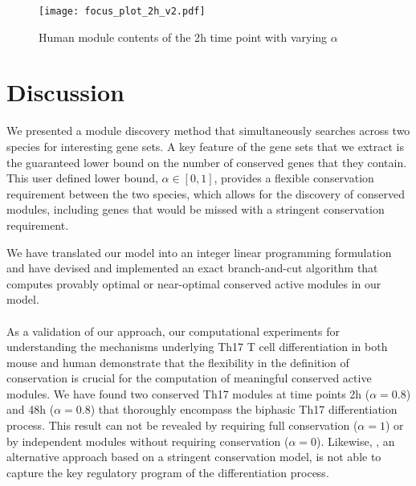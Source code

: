   \begin{figure}[p]
    \centering
    \texttt{[image: focus\_plot\_2h\_v2.pdf]}
    \caption{Human module contents of the \unit{2}{h} time point with varying $\alpha$}
    \label{fig:focus_plot}
  \end{figure}

\section{Discussion}
\label{sec:xdisc}

We presented a module discovery method that simultaneously searches across two species for interesting gene sets.
A key feature of the gene sets that we extract is the guaranteed lower bound on the number of conserved genes that they contain.
This user defined lower bound, $\alpha \in [0, 1]$, provides a flexible conservation requirement between the two species, which allows for the discovery of conserved modules, including genes that would be missed with a stringent conservation requirement.%

We have translated our model into an integer linear programming formulation and have devised and implemented an exact branch-and-cut algorithm that computes provably optimal or near-optimal conserved active modules in our model.

\paragraph{}
As a validation of our approach, our computational experiments for understanding the mechanisms underlying Th17 T cell differentiation in both mouse and human demonstrate that the flexibility in the definition of conservation is crucial for the computation of meaningful conserved active modules.
We have found two conserved Th17 modules at time points \unit{2}{h} ($\alpha = 0.8$) and \unit{48}{h} ($\alpha=0.8$) that thoroughly encompass the biphasic Th17 differentiation process.
This result can not be revealed by requiring full conservation ($\alpha = 1$) or by independent modules without requiring conservation ($\alpha = 0$).
Likewise, \nexus{}, an alternative approach based on a stringent conservation model, is not able to capture the key regulatory program of the differentiation process.

